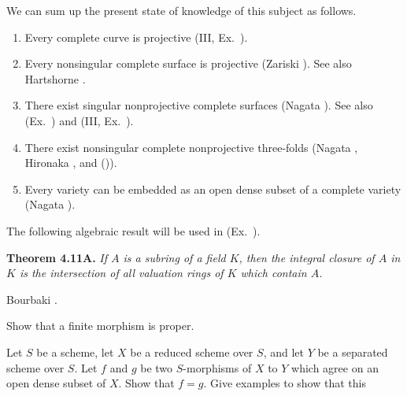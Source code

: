 {We can sum up the present state of knowledge of this subject as follows.
\begin{enumerate}[label=(\alph*),leftmargin=1.6em,nosep]
\item Every complete curve is projective (III, Ex.~).
\item Every nonsingular complete surface is projective (Zariski ). See also Hartshorne .
\item There exist singular nonprojective complete surfaces (Nagata ). See also (Ex.~) and (III, Ex.~).
\item There exist nonsingular complete nonprojective three-folds (Nagata , Hironaka , and ()).
\item Every variety can be embedded as an open dense subset of a complete variety (Nagata ).
\end{enumerate}

\smallskip
The following algebraic result will be used in (Ex.~).

\medskip
\noindent\hypertarget{result-II-4.11A}{}\textbf{Theorem 4.11A.} \emph{If $A$ is a subring of a field $K$, then the integral closure of $A$ in $K$ is the intersection of all valuation rings of $K$ which contain $A$.}

\Proof Bourbaki .

\Exercises
{\fontsize{9}{10.5}\selectfont
\begin{description}[leftmargin=2.4em,labelindent=0pt,topsep=0pt,itemsep=4pt,parsep=0pt]
\item[\hypertarget{ex-II-4.1}{}\textbf{4.1.}] Show that a finite morphism is proper.
\item[\hypertarget{ex-II-4.2}{}\textbf{4.2.}] Let $S$ be a scheme, let $X$ be a reduced scheme over $S$, and let $Y$ be a separated scheme over $S$. Let $f$ and $g$ be two $S$-morphisms of $X$ to $Y$ which agree on an open dense subset of $X$. Show that $f=g$. Give examples to show that this
\end{description}}
}
